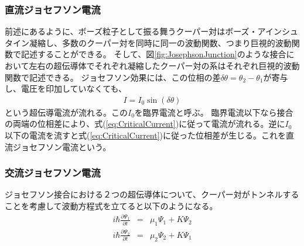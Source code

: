		\subsubsection{直流ジョセフソン電流}
		前述にあるように、ボーズ粒子として振る舞うクーパー対はボーズ・アインシュタイン凝縮し、多数のクーパー対を同時に同一の波動関数、つまり巨視的波動関数で記述することができる。
		そして、図\ref{fig:JosephsonJunction}のような接合において左右の超伝導体でそれぞれ凝縮したクーパー対の系はそれぞれ巨視的波動関数で記述できる。
		ジョセフソン効果には、この位相の差$\delta \theta = \theta_{2} - \theta_{1}$が寄与し、電圧を印加していなくても、
		\begin{eqnarray}
			I = I_{0} \sin (\delta \theta)
			\label{eq:CriticalCurrent}
		\end{eqnarray}
		という超伝導電流が流れる。この$I_{0}$を臨界電流と呼ぶ。
		臨界電流以下なら接合の両端の位相差により、式(\ref{eq:CriticalCurrent})に従って電流が流れる。逆に$I_{0}$以下の電流を流すと式(\ref{eq:CriticalCurrent})に従った位相差が生じる。これを直流ジョセフソン電流という。
		\subsubsection{交流ジョセフソン電流}
		ジョセフソン接合における２つの超伝導体について、クーパー対がトンネルすることを考慮して波動方程式を立てると以下のようになる。
		\begin{eqnarray}
			i \hbar \frac{\partial \Psi_{1}}{\partial t} & = & \mu_{1} \Psi_{1} + K \Psi_{2} \\
			i \hbar \frac{\partial \Psi_{2}}{\partial t} & = & \mu_{2} \Psi_{2} + K \Psi_{1}
			\label{eq:ACJosephson}
		\end{eqnarray}
		

